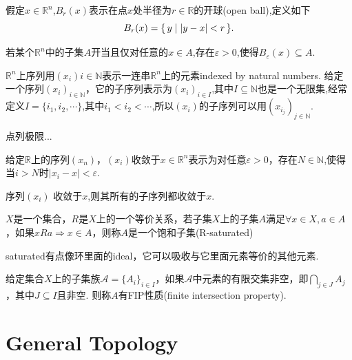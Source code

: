 \begin{definition}
\rm 假定$x \in \mathbb{R}^n$,$B_r(x)$表示在点$x$处半径为$r \in \mathbb{R}$的开球(open ball),定义如下\[B_r(x)=\{\,y\mid|y-x| < r\,\}.\]
\end{definition}

\begin{definition}
若某个$\mathbb{R}^n$中的子集$A$开当且仅对任意的$x \in A$,存在$\varepsilon > 0$,使得$B_\varepsilon(x) \subseteq A$.
\end{definition}


\begin{definition}
$\mathbb{R}^n$上序列用$(x_i)i\in\mathbb{N}$表示一连串$\mathbb{R}^n$上的元素indexed by natural numbers. 给定一个序列$(x_i)_{i\in\mathbb{N}}$，它的子序列表示为$(x_i)_{i \in I}$,其中$I \subseteq \mathbb{N}$也是一个无限集,经常定义$I = \{i_1,i_2,\cdots\}$,其中$i_1 < i_2 < \cdots$,所以$(x_i)$的子序列可以用$(x_{i_j})_{j \in \mathbb{N}}$.
\end{definition}

点列极限...

\begin{definition}
给定$\mathbb{R}$上的序列$(x_n)$，$(x_i)$收敛于$x \in \mathbb{R}^n$表示为对任意$\varepsilon > 0$，存在$N \in \mathbb{N}$,使得当$i > N$时$|x_i - x| < \varepsilon$.
\end{definition}

\begin{proposition}
序列$(x_i)$ 收敛于$x$,则其所有的子序列都收敛于$x$.
\end{proposition}

\begin{definition}[R-saturated]
$X$是一个集合，$R$是$X$上的一个等价关系，若子集$X$上的子集$A$满足$\forall x \in X, a \in A$，如果$xRa \Rightarrow x \in A$，则称$A$是一个饱和子集(R-saturated)
\end{definition}

saturated有点像环里面的ideal，它可以吸收与它里面元素等价的其他元素.

\begin{definition}
给定集合$X$上的子集族$\mathcal{A} = \{A_i\}_{i \in I}$，如果$\mathcal{A}$中元素的有限交集非空，即$\bigcap\limits_{j \in J} A_j$，其中$J \subseteq I$且非空. 则称$A$有FIP性质(finite intersection property).
\end{definition}

\newpage
\section{General Topology}
